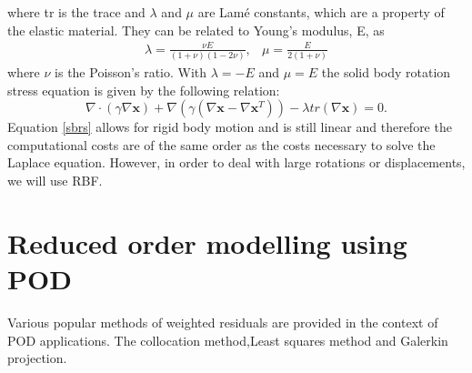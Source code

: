 \documentclass[10pt,a4paper,twoside]{article}
\begin{document}
where tr is the trace and $\lambda$ and $\mu$ are Lam\'{e} constants, which are a property of the elastic material. They can be related to Young's modulus, E, as
\begin{eqnarray}
\lambda = \frac{\nu E}{(1+\nu)(1-2\nu)},  &  \mu = \frac{ E}{2(1+\nu)}
\end{eqnarray}
where $\nu$ is the Poisson's ratio.
With $\lambda = -E$ and $\mu = E$ the solid body rotation stress equation is given by the following relation:
\begin{equation}\label{sbrs}
\nabla \cdot (\gamma \nabla \boldsymbol{x}) + \nabla (\gamma (\nabla \boldsymbol{x}-\nabla \boldsymbol{x}^T))-\lambda tr(\nabla \boldsymbol{x}) = 0.
\end{equation}
Equation \ref{sbrs} allows for rigid body motion and is still linear and therefore the computational costs are of the same order as the costs necessary to solve the Laplace equation. However, in order to deal with large rotations or displacements, we will use RBF.

\section{Reduced order modelling using POD}
Various popular methods of weighted residuals are provided in the context of POD applications.
The collocation method,Least squares method and Galerkin projection.







\end{document}

